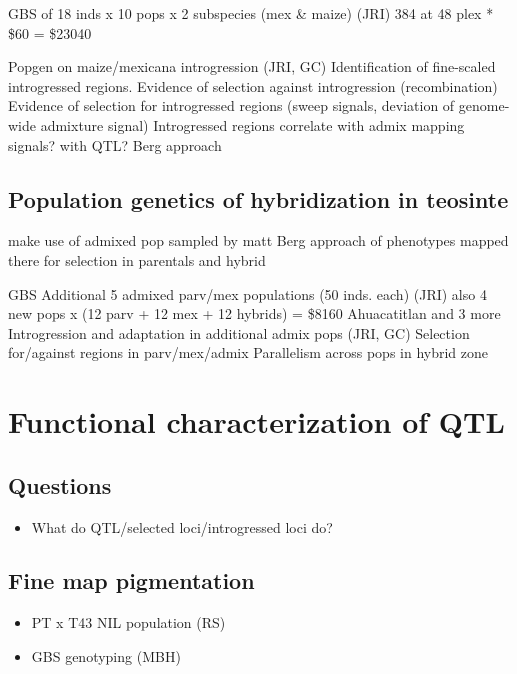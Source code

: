 GBS of 18 inds x 10 pops x 2 subspecies (mex \& maize) (JRI)
384 at 48 plex * \$60 = \$23040

Popgen on maize/mexicana introgression (JRI, GC)
Identification of fine-scaled introgressed regions.
Evidence of selection against introgression (recombination)
Evidence of selection for introgressed regions (sweep signals, deviation of genome-wide admixture signal)
Introgressed regions correlate with admix mapping signals? with QTL? Berg approach

\subsection{Population genetics of hybridization in teosinte} \label{subsec: admixpopgen}

make use of admixed pop sampled by matt
Berg approach of phenotypes mapped there for selection in parentals and hybrid

GBS Additional 5 admixed parv/mex populations (50 inds. each) (JRI)
also 4 new pops x (12 parv + 12 mex + 12 hybrids) = \$8160
Ahuacatitlan and 3 more
Introgression and adaptation in additional admix pops (JRI, GC)
Selection for/against regions in parv/mex/admix
Parallelism across pops in hybrid zone

\section{Functional characterization of QTL} \label{sec:funchar}

\subsection{Questions}
\begin{itemize}
\item What do QTL/selected loci/introgressed loci do?
\end{itemize}

\subsection{Fine map pigmentation} \label{subsec:pigment}
\begin{itemize}
\item PT x T43 NIL population (RS)
\item GBS genotyping (MBH)
\end{itemize}

